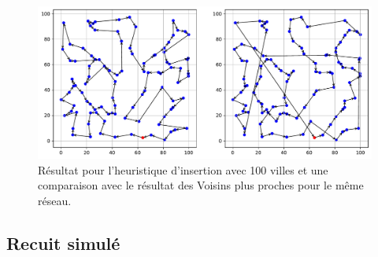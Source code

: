 \documentclass[a4paper,11pt,fleqn]{article}
\begin{document}
\begin{figure}[H]
    \centering
    \includegraphics[width=\textwidth]{images/insertion_100_villes_nn.pdf}
    \caption{Résultat pour l'heuristique d'insertion avec 100 villes et une comparaison avec le résultat des Voisins plus proches pour le même réseau.}
    \label{fig:insert-100}
\end{figure}

\subsection*{Recuit simulé}
\end{document}

